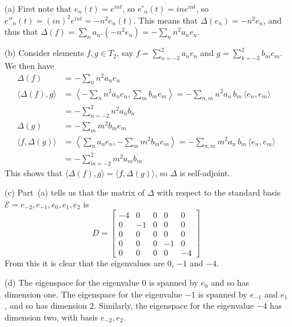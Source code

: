 \documentclass{amsart}
\newcommand{\bsm}       {\left[\begin{smallmatrix}}
\newcommand{\esm}       {\end{smallmatrix}\right]}
\newcommand{\Dl}        {\Delta}
\newcommand{\ip}[1]     {\langle #1\rangle}
\newcommand{\CE}        {{\mathcal{E}}}
\renewcommand{\:}       {\colon}
\theoremstyle{definition}
\renewenvironment{solution}{\SolutionAtEnd}{\endSolutionAtEnd}
\begin{document}
\begin{solution}
 \begin{itemize}
  \item[(a)]
   First note that $e_n(t)=e^{int}$, so $e'_n(t)=ine^{int}$, so
   $e''_n(t)=(in)^2e^{int}=-n^2e_n(t)$.  This means that
   $\Dl(e_n)=-n^2e_n$, and thus that
   $\Dl(f)=\sum_n a_n.(-n^2e_n)=-\sum_n n^2 a_n e_n$.
  \item[(b)]
   Consider elements $f,g\in T_2$, say $f=\sum_{n=-2}^2a_ne_n$ and
   $g=\sum_{k=-2}^2b_me_m$.  We then have 
   \begin{align*}
    \Dl(f) &= -\sum_n n^2 a_n e_n \\   
    \ip{\Dl(f),g} &=
     \left\langle -\sum_n n^2a_ne_n,\sum_m b_me_m\right\rangle 
      = -\sum_{n,m} n^2 a_n\,\overline{b_m}\,\ip{e_n,e_m} \\
    &= -\sum_{n=-2}^2 n^2 a_n \overline{b_n} \\  
    \Dl(g) &= -\sum_m m^2 b_m e_m \\
    \ip{f,\Dl(g)} &=
     \left\langle\sum_n a_ne_n,-\sum_m m^2b_me_m\right\rangle 
      = -\sum_{n,m} m^2 a_n\,\overline{b_m}\,\ip{e_n,e_m} \\
    &= -\sum_{m=-2}^2 m^2 a_m \overline{b_m}
   \end{align*}
   This shows that $\ip{\Dl(f),g}=\ip{f,\Dl(g)}$, so $\Dl$ is
   self-adjoint.
  \item[(c)] Part~(a) tells us that the matrix of $\Dl$ with respect
   to the standard basis $\CE=e_{-2},e_{-1},e_0,e_1,e_2$ is
   {\tiny \[
     D = \bsm -4 &  0 & 0 &  0 &  0 \\
               0 & -1 & 0 &  0 &  0 \\
               0 &  0 & 0 &  0 &  0 \\
               0 &  0 & 0 & -1 &  0 \\
               0 &  0 & 0 &  0 & -4 \esm 
   \]}
   From this it is clear that the eigenvalues are $0$, $-1$ and $-4$.
  \item[(d)] The eigenspace for the eigenvalue $0$ is spanned by $e_0$
   and so has dimension one.  The eigenspace for the eigenvalue $-1$ is
   spanned by $e_{-1}$ and $e_1$, and so has dimension $2$.
   Similarly, the eigenspace for the eigenvalue $-4$ has dimension two,
   with basis $e_{-2},e_2$. 
 \end{itemize}
\end{solution}
\end{document}
